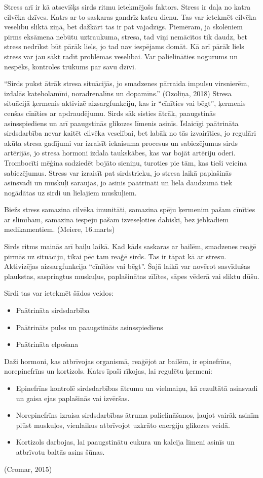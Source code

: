 \documentclass[12pt]{article}
\begin{document}
Stress arī ir kā atsevišķs sirds ritmu ietekmējošs faktors.
Stress ir daļa no katra cilvēka dzīves. Katrs ar to saskaras gandrīz katru dienu. Tas var ietekmēt cilvēka veselību sliktā ziņā, bet dažkārt tas ir pat vajadzīgs. Piemēram, ja skolēniem pirms eksāmena nebūtu uztraukuma, stresa, tad viņi nemācītos tik daudz, bet stress nedrīkst būt pārāk liels, jo tad nav iespējams domāt. Kā arī pārāk liels stress var jau sākt radīt problēmas veselībai. Var palielināties nogurums un nespēks, kontroles trūkums par savu dzīvi.\par
“Sirds pukst ātrāk stresa situācijās, jo smadzenes pārraida impulsu virsnierēm, izdalās kateholamīni, noradrenalīns un dopamīns.” (Ozoliņa, 2018) Stresa situācijā ķermenis aktivizē aizsargfunkciju, kas ir  “cīnīties vai bēgt”, ķermenis cenšas cīnīties ar apdraudējumu. Sirds sāk sisties ātrāk, paaugstinās asinsspiediens un arī paaugstinās glikozes līmenis asinīs. Īslaicīgi paātrināta sirdsdarbība nevar kaitēt cilvēka veselībai, bet labāk no tās izvairīties, jo regulāri akūta stresa gadījumi var izraisīt iekaisuma procesus un sabiezējumus sirds artērijās, jo stresa hormoni izdala taukskābes, kas var bojāt artēriju oderi. Trombocīti mēģina sadziedēt bojāto sieniņu, turoties pie tām, kas tieši veicina sabiezējumus. Stress var izraisīt pat sirdstrieku, jo stresa laikā paplašinās asinsvadi un muskuļi saraujas, jo asinis paātrināti un lielā daudzumā tiek nogādātas uz sirdi un lielajiem muskuļiem. \par
Biežs stress samazina cilvēka imunitāti, samazina spēju ķermenim pašam cīnīties ar slimī\-bām, samazina iespēju pašam izveseļoties dabiski, bez jebkādiem medikamentiem. (Meiere, 16.marts)

Sirds ritms mainās arī baiļu laikā.
Kad kāds saskaras ar bailēm, smadzenes reaģē pirmās uz situāciju, tikai pēc tam reaģē sirds. Tas ir tāpat kā ar stresu. Aktivizējas aizsargfunkcija ``cīnīties vai bēgt''.  Šajā laikā var novērot sasvīdušas plaukstas, saspringtus muskuļus, paplašinātas zīlītes, sāpes vēderā vai sliktu dūšu. \par
Sirdi tas var ietekmēt šādos veidos:
\begin{itemize}
\setlength\itemsep{0em}
  \item Paātrināta sirdsdarbība
  \item Paātrināts pulss un paaugstināts asinsspiediens
  \item Paātrināta elpošana
\end{itemize}
Daži hormoni, kas atbrīvojas organismā, reaģējot ar bailēm, ir epinefrīns, norepinefrīns un kortizols. Katrs īpaši rīkojas, lai regulētu ķermeni:
\begin{itemize}
\setlength\itemsep{0em}
  \item Epinefrīns kontrolē sirdsdarbības ātrumu un vielmaiņu, kā rezultātā asinsvadi un gaisa ejas paplašinās vai izvēršas.
  \item Norepinefrīns izraisa sirdsdarbības ātruma palielināšanos, ļaujot vairāk asinīm plūst mus\-kuļos, vienlaikus atbrīvojot uzkrāto enerģiju glikozes veidā. 
  \item Kortizols darbojas, lai paaugstinātu cukura un kalcija līmeni asinīs un atbrīvotu baltās asins šūnas.
\end{itemize}
(Cromar, 2015)
\end{document}
